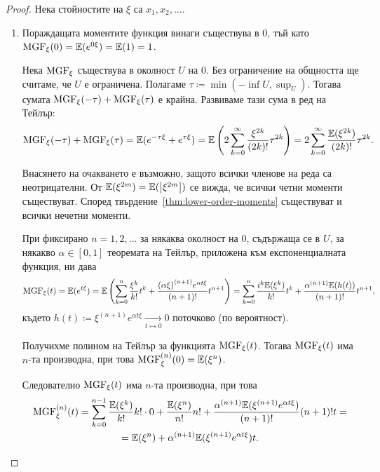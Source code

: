 \documentclass[numbers=endperiod, DIV=15, bibliography=totocnumbered]{scrartcl}
\begin{document}
\begin{proof}
  Нека стойностите на $\xi$ са $x_1, x_2, \ldots$.

  \mbox{}
  \begin{enumerate}
    \item Пораждащата моментите функция винаги съществува в $0$, тъй като $\operatorname{MGF}_\xi(0) = \mathbb{E}(e^{0\xi}) = \mathbb{E}(1) = 1$.

    Нека $\operatorname{MGF}_\xi$ съществува в околност $U$ на $0$. Без ограничение на общността ще считаме, че $U$ е ограничена. Полагаме $\tau \coloneqq \min(-\inf U, \sup_U)$. Тогава сумата $\operatorname{MGF}_\xi(-\tau) + \operatorname{MGF}_\xi(\tau)$ е крайна. Развиваме тази сума в ред на Тейлър:
    \begin{displaymath}
      \operatorname{MGF}_\xi(-\tau) + \operatorname{MGF}_\xi(\tau)
      =
      \mathbb{E}(e^{-\tau\xi} + e^{\tau\xi})
      =
      \mathbb{E}\left( 2 \sum_{k=0}^\infty \frac {\xi^{2k}} {(2k)!} \tau^{2k} \right)
      =
      2 \sum_{k=0}^\infty \frac {\mathbb{E}(\xi^{2k})} {(2k)!} \tau^{2k}.
    \end{displaymath}

    Внасянето на очакването е възможно, защото всички членове на реда са неотрицателни. От $\mathbb{E}(\xi^{2m}) = \mathbb{E}(\left\vert \xi^{2m} \right\vert)$ се вижда, че всички четни моменти съществуват. Според твърдение~\ref{thm:lower-order-moments} съществуват и всички нечетни моменти.

    При фиксирано $n = 1, 2, \ldots$ за някаква околност на $0$, съдържаща се в $U$, за някакво $\alpha \in [0, 1]$ теоремата на Тейлър, приложена към експоненциалната функция, ни дава
    \begin{displaymath}
      \operatorname{MGF}_\xi(t)
      =
      \mathbb{E}(e^{t\xi})
      =
      \mathbb{E}\left(\sum_{k=0}^n \frac {\xi^k} {k!} t^k + \frac {{(\alpha \xi)}^{(n+1)} e^{\alpha t \xi}} {(n+1)!} t^{n+1} \right)
      =
      \sum_{k=0}^n \frac {i^k \mathbb{E}(\xi^k)} {k!} t^k + \frac {{\alpha}^{(n+1)} \mathbb{E}(h(t))} {(n+1)!} t^{n+1},
    \end{displaymath}
    където $h(t) \coloneqq \xi^{(n+1)} e^{\alpha t \xi} \underset {t \mapsto 0} \longrightarrow 0$ поточково (по вероятност).

    Получихме полином на Тейлър за функцията $\operatorname{MGF}_\xi(t)$. Тогава $\operatorname{MGF}_\xi(t)$ има $n$-та производна, при това $\operatorname{MGF}^{(n)}_\xi(0) = \mathbb{E}(\xi^n)$.

    Следователно $\operatorname{MGF}_\xi(t)$ има $n$-та производна, при това
    \begin{multline*}
      \operatorname{MGF}^{(n)}_\xi(t)
      =
      \sum_{k=0}^{n-1} \frac {\mathbb{E}(\xi^k)} {k!} k! \cdot 0 + \frac {\mathbb{E}(\xi^n)} {n!} n! + \frac {\alpha^{(n+1)} \mathbb{E}(\xi^{(n+1)} e^{\alpha t \xi})} {(n+1)!} (n+1)! t
      = \\ =
      \mathbb{E}(\xi^n) + \alpha^{(n+1)} \mathbb{E}(\xi^{(n+1)} e^{\alpha t \xi}) t.
    \end{multline*}


\end{enumerate}
\end{proof}
\end{document}
